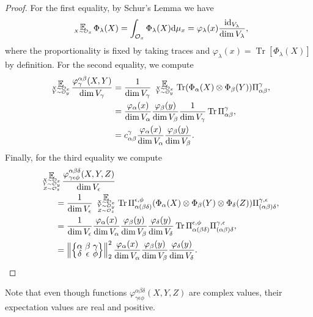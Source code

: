 \documentclass[notitlepage, 11pt, letterpaper]{amsart}
\makeatletter
\theoremstyle{plain}
\theoremstyle{definition}
\DeclareMathOperator{\Tr}{Tr}
\DeclareMathOperator{\id}{id}
\DeclareMathOperator*{\expect}{\mathbb{E}}
\newcommand{\diff}{\mathrm{d}}
\newcommand{\orbit}{\mathcal O}
\newcommand{\norm}[1]{\left\lVert#1\right\rVert}
\newcommand{\ot}{\otimes} %
\newcommand{\vp}{\varphi} %
\newcommand{\projl}{\Pi_{(\ya \yb) \yd}^{\yc, \ye}}
\newcommand{\projr}{\Pi_{\ya (\yb \yd)}^{\ye, \yf}}
\newcommand{\ex}{x}
\newcommand{\ey}{y}
\newcommand{\ez}{z}
\newcommand{\ya}{\alpha}
\newcommand{\yb}{\beta}
\newcommand{\yc}{\gamma}
\newcommand{\yd}{\delta}
\newcommand{\ye}{\epsilon}
\newcommand{\yf}{\phi}
\newcommand{\yx}{\lambda}
\newcommand{\tightcurlysixj}[1]{
\begingroup
\arraycolsep=1.5pt
\renewcommand{\arraystretch}{0.3}
\left\{\!\begin{array}{ccc}
    #1
\end{array}\!\right\}
\endgroup
}
\newcommand{\abcdefsymbol}{\tightcurlysixj{\alpha & \beta & \gamma \\ \delta & \epsilon & \phi}}
\newcommand{\tightsinglesubstack}[2]{
\begingroup
    \renewcommand{\arraystretch}{0.3}
    \begin{array}{c@{}} #1 \\ {\scriptscriptstyle #2} \end{array}
\endgroup
}
\newcommand{\tightdoublesubstack}[3]{
\begingroup
    \renewcommand{\arraystretch}{0.3}
    \begin{array}{c@{}} #1 \\ {\scriptscriptstyle #2} \\ {\scriptscriptstyle #3} \end{array}
\endgroup
}
\newcommand{\tighttriplesubstack}[4]{
\begingroup
    \renewcommand{\arraystretch}{0.3}
    \begin{array}{c@{}} #1 \\ {\scriptscriptstyle #2} \\ {\scriptscriptstyle #3} \\ {\scriptscriptstyle #4} \end{array}
\endgroup
}
\makeatother
\begin{document}
\begin{proof}
    For the first equality, by Schur's Lemma we have
    \begin{equation}
        \tightsinglesubstack{\expect}{X \sim \orbit_{\ex}}\, \Phi_\yx(X) = \int_{\orbit_x} \Phi_\yx(X) \diff\mu_x = \vp_\yx(x) \frac{\id_{V_\yx}}{\dim V_\yx},
    \end{equation}
    where the proportionality is fixed by taking traces and $\vp_\yx(x)  = \Tr[\Phi_\yx(X)]$ by definition.
    For the second equality, we compute
    \begin{align}
        \begin{split}
            \tightdoublesubstack{\expect}{X \sim \orbit_{\ex}}{Y \sim \orbit_{\ey}}\, \frac{\vp^{\ya \yb}_\yc(X, Y)}{\dim V_\yc}
            &= \frac{1}{\dim V_\yc} \tightdoublesubstack{\expect}{X \sim \orbit_{\ex}}{Y \sim \orbit_{\ey}}\, \Tr (\Phi_\ya(X) \ot \Phi_\yb(Y)) \Pi_{\ya \yb}^\yc, \\
            &= \frac{\vp_\ya(x)}{\dim V_\ya}\frac{\vp_\yb(y)}{\dim V_\yb} \frac{1}{\dim V_\yc} \Tr \Pi_{\ya \yb}^\yc, \\
            &= c_{\ya \yb}^\yc \frac{\vp_\ya(x)}{\dim V_\ya}\frac{\vp_\yb(y)}{\dim V_\yb}.
        \end{split}
    \end{align}
    Finally, for the third equality we compute
    \begin{align}
        \begin{split}
            &\tighttriplesubstack{\expect}{X \sim \orbit_{\ex}}{Y \sim \orbit_{\ey}}{Z \sim \orbit_{\ez}}\, \frac{\vp^{\ya \yb \yd}_{\yc \ye \yf}(X, Y, Z)}{\dim V_\ye}\\
            &\qquad=
            \frac{1}{{\dim V_\ye}} \tighttriplesubstack{\expect}{X \sim \orbit_{\ex}}{Y \sim \orbit_{\ey}}{Z \sim \orbit_{\ez}}\,
            \Tr \projr (\Phi_\ya(X) \ot \Phi_\yb(Y) \ot \Phi_\yd(Z))\projl, \\
            &\qquad=
            \frac{1}{{\dim V_\ye}}  \frac{\vp_\ya(x)}{\dim V_\ya}\frac{\vp_\yb(y)}{\dim V_\yb}
            \frac{\vp_\yd(y)}{\dim V_\yd} \Tr \projr \projl, \\
            &\qquad=
            \norm{\abcdefsymbol}_2^2 \frac{\vp_\ya(x)}{\dim V_\ya}\frac{\vp_\yb(y)}{\dim V_\yb}
            \frac{\vp_\yd(y)}{\dim V_\yd}.
        \end{split}
    \end{align}
\end{proof}
Note that even though functions $\vp^{\ya \yb \yd}_{\yc \ye \yf}(X, Y, Z)$ are complex values, their expectation values are real and positive.
\end{document}
